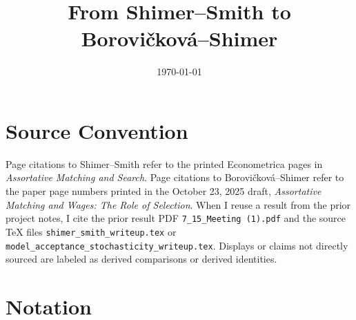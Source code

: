 \documentclass[11pt]{article}
\title{From Shimer--Smith to Borovi\v{c}kov\'a--Shimer}
\author{}
\date{\today}
\begin{document}
\maketitle

\section*{Source Convention}

Page citations to Shimer--Smith refer to the printed Econometrica pages in
\emph{Assortative Matching and Search}. Page citations to Borovi\v{c}kov\'a--Shimer
refer to the paper page numbers printed in the October 23, 2025 draft,
\emph{Assortative Matching and Wages: The Role of Selection}. When I reuse a
result from the prior project notes, I cite the prior result PDF
\texttt{7\_15\_Meeting (1).pdf} and the source \TeX{} files
\texttt{shimer\_smith\_writeup.tex} or
\texttt{model\_acceptance\_stochasticity\_writeup.tex}. Displays or claims not
directly sourced are labeled as derived comparisons or derived identities.

\section{Notation}
\end{document}
